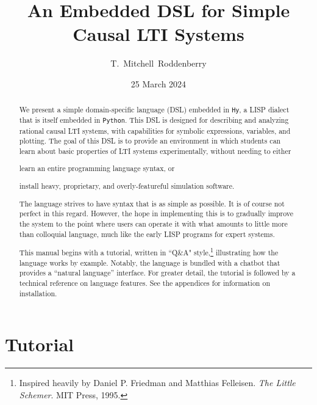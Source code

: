 \documentclass[11pt,letter]{article}
\title{An Embedded DSL for Simple Causal LTI Systems}
\author{T.~Mitchell~Roddenberry}
\date{25 March 2024}
\begin{document}
\maketitle

\begin{abstract}
  We present a simple domain-specific language (DSL) embedded in \texttt{Hy}, a LISP dialect that is itself embedded in \texttt{Python}.
  This DSL is designed for describing and analyzing rational causal LTI systems, with capabilities for symbolic expressions, variables, and plotting.
  The goal of this DSL is to provide an environment in which students can learn about basic properties of LTI systems experimentally, without needing to either
  \begin{enumerate*}[label=(\roman*)]
  \item learn an entire programming language syntax, or
  \item install heavy, proprietary, and overly-featureful simulation software.
  \end{enumerate*}

  The language strives to have syntax that is as simple as possible.
  It is of course not perfect in this regard.
  However, the hope in implementing this is to gradually improve the system to the point where users can operate it with what amounts to little more than colloquial language, much like the early LISP programs for expert systems.

  This manual begins with a tutorial, written in ``Q{\&}A" style,\footnote{Inspired heavily by Daniel P. Friedman and Matthias Felleisen. \emph{The Little Schemer}. MIT Press, 1995.} illustrating how the language works by example.
  Notably, the language is bundled with a chatbot that provides a ``natural language'' interface.
  For greater detail, the tutorial is followed by a technical reference on language features.
  See the appendices for information on installation.
\end{abstract}

\newpage

\tableofcontents

\newpage

\section{Tutorial}\label{sec:tutorial}
\end{document}
